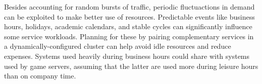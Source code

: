 Besides accounting for random bursts of traffic, periodic fluctuactions in demand can be exploited to make better use of resources. Predictable events like business hours, holidays, academic calendars, and stable cycles can significantly influence some service workloads. Planning for these by pairing complementary services in a dynamically-configured cluster can help avoid idle resources and reduce expenses. Systems used heavily during business hours could share with systems used by game servers, assuming that the latter are used more during leisure hours than on company time.
